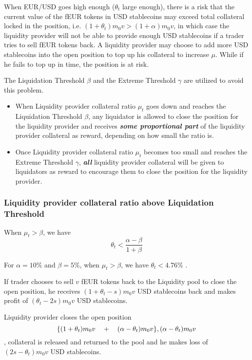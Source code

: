\documentclass{article}
\begin{document}
When EUR/USD goes high enough ($\theta_t$ large enough), there is a risk that the current value of the fEUR tokens in USD stablecoins may exceed total collateral locked in the position, i.e. $(1+\theta_t)m_0 v> (1+\alpha)m_0 v$,  in which case the liquidity provider will not be able to provide enough USD stablecoins if a trader tries to sell fEUR tokens back. A liquidity provider may choose to add more USD stablecoins into the open position to top up his collateral to increase $\mu$. While if he fails to top up in time, the position is at risk. \par 

The Liquidation Threshold $\beta$ and the Extreme Threshold $\gamma$ are utilized to avoid this problem. 
\begin{itemize}
    \item When Liquidity provider collateral ratio $\mu_t$ goes down and reaches the Liquidation Threshold $\beta$, any liquidator is allowed to close the position for the liquidity provider and receives \textbf{\textit{some proportional part}} of the liquidity provider collateral as reward, depending on how small the ratio is.
    \item Once Liquidity provider collateral ratio $\mu_t$ becomes too small and reaches the Extreme Threshold  $\gamma$, \textbf{\textit{all}} liquidity provider collateral will be given to liquidators as reward to encourage them to close the position for the liquidity provider.
\end{itemize}
 
\subsubsection{Liquidity provider collateral ratio above Liquidation Threshold}
When  $\mu_t>\beta$, we have
$$\theta_t<\frac{\alpha - \beta}{1+ \beta}$$

For $\alpha = 10\%$ and $\beta = 5\%$, when $\mu_t>\beta$, we have $\theta_t<4.76\%$ .\par

If trader chooses to sell $v$ fEUR tokens back to the Liquidity pool to close the open position, he receives $(1+\theta_t -s)m_0 v$ USD stablecoins back and makes profit of  $(\theta_t -2s)m_0 v$ USD stablecoins.\par

Liquidity provider closes the open position
$$\{ (1+\theta_t)m_0 v   \quad +  \quad  (\alpha-\theta_t)m_0 v \}, \\ (\alpha-\theta_t)m_0 v$$
, collateral is released and returned to the pool and he makes loss of $(2s - \theta_t)m_0 v$ USD stablecoins. \par
\end{document}
